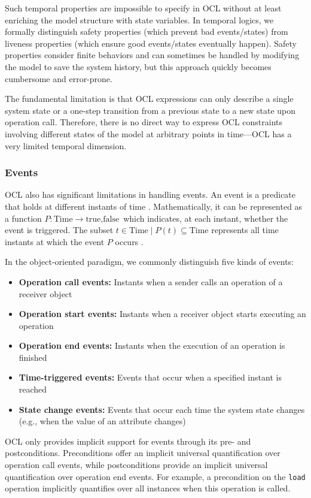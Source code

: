 Such temporal properties are impossible to specify in OCL without at least enriching 
the model structure with state variables. In temporal logics, we formally distinguish 
safety properties (which prevent bad events/states) from liveness properties (which 
ensure good events/states eventually happen). Safety properties consider finite 
behaviors and can sometimes be handled by modifying the model to save the system 
history, but this approach quickly becomes cumbersome and error-prone.

The fundamental limitation is that OCL expressions can only describe a single system 
state or a one-step transition from a previous state to a new state upon operation 
call. Therefore, there is no direct way to express OCL constraints involving different 
states of the model at arbitrary points in time—OCL has a very limited temporal 
dimension.

\subsubsection{Events}
OCL also has significant limitations in handling events. An event is a predicate that 
holds at different instants of time . Mathematically, it can be represented as a 
function 
$P : \text{Time} \rightarrow {\text{true}, \text{false}}$ 
which indicates, at each instant, whether the event is triggered. The subset 
${t \in \text{Time} \mid P(t)} \subseteq \text{Time}$ 
represents all time instants at which the event $P$ occurs \cite{TemporalAndEventOCL}.

In the object-oriented paradigm, we commonly distinguish five kinds of events: 
\begin{itemize} 
    \item \textbf{Operation call events:} Instants when a sender calls an operation of a receiver object 
    \item \textbf{Operation start events:} Instants when a receiver object starts executing an operation 
    \item \textbf{Operation end events:} Instants when the execution of an operation is finished 
    \item \textbf{Time-triggered events:} Events that occur when a specified instant is reached 
    \item \textbf{State change events:} Events that occur each time the system state changes (e.g., when the value of an attribute changes) 
\end{itemize}

OCL only provides implicit support for events through its pre- and postconditions. 
Preconditions offer an implicit universal quantification over operation call events, 
while postconditions provide an implicit universal quantification over operation end 
events. For example, a precondition on the \texttt{load} operation implicitly 
quantifies over all instances when this operation is called.

